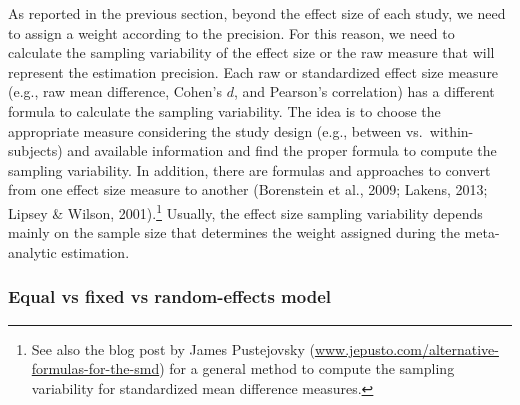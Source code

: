 \documentclass[
  man,floatsintext]{apa6}
\begin{document}
As reported in the previous section, beyond the effect size of each study, we need to assign a weight according to the precision. For this reason, we need to calculate the sampling variability of the effect size or the raw measure that will represent the estimation precision. Each raw or standardized effect size measure (e.g., raw mean difference, Cohen's \(d\), and Pearson's correlation) has a different formula to calculate the sampling variability. The idea is to choose the appropriate measure considering the study design (e.g., between vs.~within-subjects) and available information and find the proper formula to compute the sampling variability. In addition, there are formulas and approaches to convert from one effect size measure to another (Borenstein et al., 2009; Lakens, 2013; Lipsey \& Wilson, 2001).\footnote{See also the blog post by James Pustejovsky (\href{https://www.jepusto.com/alternative-formulas-for-the-smd/}{www.jepusto.com/alternative-formulas-for-the-smd}) for a general method to compute the sampling variability for standardized mean difference measures.} Usually, the effect size sampling variability depends mainly on the sample size that determines the weight assigned during the meta-analytic estimation.

\subsubsection{Equal vs fixed vs random-effects model}\label{equal-vs-fixed-vs-random-effects-model}
\end{document}
